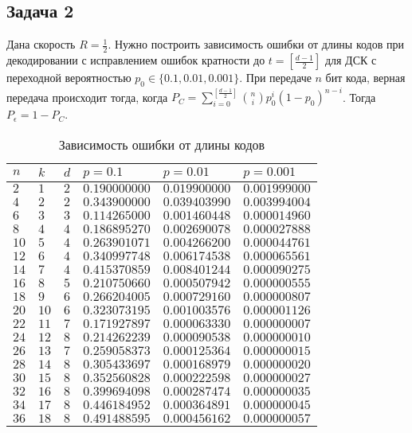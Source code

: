 \documentclass{article}
\begin{document}
\subsection{Задача 2}
%
Дана скорость $R=\frac{1}{2}$. Нужно построить зависимость ошибки от длины кодов при декодировании с исправлением ошибок кратности до $t=[\frac{d-1}{2}]$ для ДСК с переходной вероятностью $p_{0} \in \{ 0.1, 0.01, 0.001 \}$. При передаче $n$ бит кода, верная передача происходит тогда, когда $P_{C}=\sum_{i=0}^{[\frac{d-1}{2}]}\binom{n}{i}p_{0}^{i}(1-p_{0})^{n-i}$. Тогда $P_{\epsilon}=1-P_{C}$.
%
\begin{table}[]
\centering
\caption{Зависимость ошибки от длины кодов}
\begin{tabular}{|l|l|l|l|l|l|}
\hline
$n$  & $k$  & $d$ & $p=0.1$ & $p=0.01$  & $p=0.001$ \\ \hline
$2$ & $1$ & $2$ & $0.190000000$ & $0.019900000$ & $0.001999000$ \\
$4$ & $2$ & $2$ & $0.343900000$ & $0.039403990$ & $0.003994004$ \\
$6$ & $3$ & $3$ & $0.114265000$ & $0.001460448$ & $0.000014960$ \\
$8$ & $4$ & $4$ & $0.186895270$ & $0.002690078$ & $0.000027888$ \\
$10$ & $5$ & $4$ & $0.263901071$ & $0.004266200$ & $0.000044761$ \\
$12$ & $6$ & $4$ & $0.340997748$ & $0.006174538$ & $0.000065561$ \\
$14$ & $7$ & $4$ & $0.415370859$ & $0.008401244$ & $0.000090275$ \\
$16$ & $8$ & $5$ & $0.210750660$ & $0.000507942$ & $0.000000555$ \\
$18$ & $9$ & $6$ & $0.266204005$ & $0.000729160$ & $0.000000807$ \\
$20$ & $10$ & $6$ & $0.323073195$ & $0.001003576$ & $0.000001126$ \\
$22$ & $11$ & $7$ & $0.171927897$ & $0.000063330$ & $0.000000007$ \\
$24$ & $12$ & $8$ & $0.214262239$ & $0.000090538$ & $0.000000010$ \\
$26$ & $13$ & $7$ & $0.259058373$ & $0.000125364$ & $0.000000015$ \\
$28$ & $14$ & $8$ & $0.305433697$ & $0.000168979$ & $0.000000020$ \\
$30$ & $15$ & $8$ & $0.352560828$ & $0.000222598$ & $0.000000027$ \\
$32$ & $16$ & $8$ & $0.399694098$ & $0.000287474$ & $0.000000035$ \\
$34$ & $17$ & $8$ & $0.446184952$ & $0.000364891$ & $0.000000045$ \\
$36$ & $18$ & $8$ & $0.491488595$ & $0.000456162$ & $0.000000057$ \\
\hline
\end{tabular}
\end{table}
\end{document}
